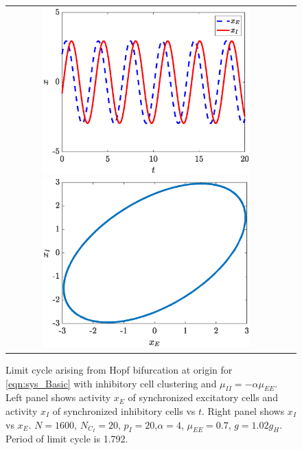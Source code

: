 \documentclass[11pt,reqno]{amsart}
\begin{document}
\begin{figure}
    \centering
    \begin{tabular}{cc}
    \includegraphics[width=8cm]{images/limitcycleIC1.eps}
    \includegraphics[width=8cm]{images/limitcycleIC2.eps}
    \end{tabular}
    \caption{Limit cycle arising from Hopf bifurcation at origin for \cref{eqn:sys_Basic} with inhibitory cell clustering and $\mu_{II} = -\alpha \mu_{EE}$. Left panel shows activity $x_E$ of synchronized excitatory cells and activity $x_I$ of synchronized inhibitory cells vs $t$. Right panel shows $x_I$ vs $x_E$. $N=1600$, $N_{C_I} = 20$, $p_I = 20$,$\alpha = 4$, $\mu_{EE}= 0.7$, $g = 1.02 g_H$. Period of limit cycle is 1.792.} 
    \label{fig:limitcycleIC}
\end{figure}
\end{document}

